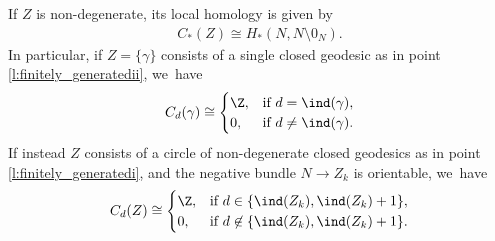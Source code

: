 \begin{Lemma}\label{l:non_deg_visible}
If $Z$ is non-degenerate, its local homology is given by
\begin{align*}
C_*(Z)\cong H_*(N,N\setminus0_N).
\end{align*}
In particular, if $Z=\{\gamma\}$ consists of a single closed geodesic as in point \eqref{l:finitely_generatedii}, we~have
\[
C_d(\gamma)
\cong
\begin{cases}
\Z, & \mbox{if } d=\ind(\gamma), \\
0, & \mbox{if } d\neq\ind(\gamma).
\end{cases}
\]
If instead $Z$ consists of a circle of non-degenerate closed geodesics as in point \eqref{l:finitely_generatedi}, and the negative bundle $N\to Z_k$ is orientable, we~have
\begin{align}
\label{e:loc_hom_circle}
C_d(Z)
\cong
\begin{cases}
\Z, & \mbox{if } d\in\{\ind(Z_k),\ind(Z_k)+1\}, \\
0, & \mbox{if }d\not\in\{\ind(Z_k),\ind(Z_k)+1\}.
\end{cases}
\end{align}
\end{Lemma}


